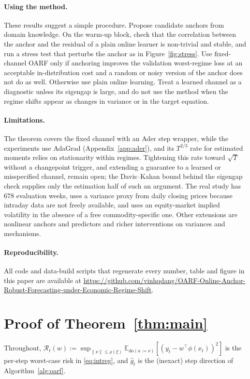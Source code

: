 \documentclass[12pt]{article}
\theoremstyle{plain}
\theoremstyle{remark}
\newcommand{\E}{\mathbb{E}}
\newcommand{\doop}{\mathrm{do}}
\newcommand{\OARF}{\textsc{OARF}}
\begin{document}
\paragraph{Using the method.}
These results suggest a simple procedure. Propose candidate anchors from domain
knowledge. On the warm-up block, check that the correlation between the anchor and the
residual of a plain online learner is non-trivial and stable, and run a stress test
that perturbs the anchor as in Figure~\ref{fig:stress}. Use fixed-channel \OARF{} only
if anchoring improves the validation worst-regime loss at an acceptable in-distribution
cost and a random or noisy version of the anchor does not do as well. Otherwise use
plain online learning. Treat a learned channel as a diagnostic unless its eigengap is
large, and do not use the method when the regime shifts appear as changes in variance
or in the target equation.

\paragraph{Limitations.}
The theorem covers the fixed channel with an Ader step wrapper, while the experiments
use AdaGrad (Appendix~\ref{app:ader}), and its $T^{2/3}$ rate for estimated moments
relies on stationarity within regimes. Tightening this rate toward $\sqrt{T}$ without a
changepoint trigger, and extending a guarantee to a learned or misspecified channel,
remain open; the Davis--Kahan bound behind the eigengap check supplies only the
estimation half of such an argument. The real study has $678$ evaluation weeks, uses a
variance proxy from daily closing prices because intraday data are not freely
available, and uses an equity-market implied volatility in the absence of a free
commodity-specific one. Other extensions are nonlinear anchors and predictors and
richer interventions on variances and mechanisms.

\paragraph{Reproducibility.}
All code and data-build scripts that regenerate every number, table and figure in this
paper are available at
\url{https://github.com/vinhqdang/OARF-Online-Anchor-Robust-Forecasting-under-Economic-Regime-Shift}.

\appendix

\section{Proof of Theorem~\ref{thm:main}}\label{app:proof}
Throughout, $\mathcal{R}_t(w):=\sup_{\|\nu\|\le\rho(\xi)}\E_{\doop(a:=\nu)}
[(y_t-w^\top\phi(x_t))^2]$ is the per-step worst-case risk in \eqref{eq:intreg}, and
$\hat g_t$ is the (inexact) step direction of Algorithm~\ref{alg:oarf}.
\end{document}
